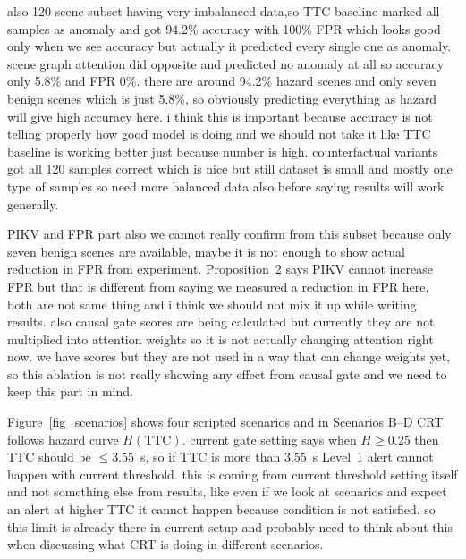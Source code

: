 also 120 scene subset  having very imbalanced data,so  TTC baseline marked all samples as anomaly and got 94.2\% accuracy with 100\% FPR which looks good only when we see accuracy but actually it predicted every single one as anomaly. scene graph attention did opposite and predicted no anomaly at all so accuracy only 5.8\% and FPR 0\%. there are around 94.2\% hazard scenes and only seven benign scenes which is just 5.8\%, so obviously predicting everything as hazard will give high accuracy here. i think this is important because accuracy is not telling properly how good model is doing and we should not take it like TTC baseline is working better just because number is high. counterfactual variants got all 120 samples correct which is nice but still dataset is small and mostly one type of samples so need more balanced data also before saying results will work generally.

PIKV and FPR part also we cannot really confirm from this subset because only seven benign scenes are available, maybe it is not enough to show actual reduction in FPR from experiment. Proposition~2 says PIKV cannot increase FPR but that is different from saying we measured a reduction in FPR here, both are not same thing and i think we should not mix it up while writing results. also causal gate scores are being calculated but currently they are not multiplied into attention weights so it is not actually changing attention right now. we have scores but they are not used in a way that can change weights yet, so this ablation is not really showing any effect from causal gate and we need to keep this part in mind.

Figure~\ref{fig_scenarios} shows four scripted scenarios and in Scenarios B--D CRT follows hazard curve $H(\text{TTC})$. current gate setting says when $H \ge 0.25$ then TTC should be $\le 3.55$~s, so if TTC is more than 3.55~s Level~1 alert cannot happen with current threshold. this is coming from current threshold setting itself and not something else from results, like even if we look at scenarios and expect an alert at higher TTC it cannot happen because condition is not satisfied. so this limit is already there in current setup and probably need to think about this when discussing what CRT is doing in different scenarios.

